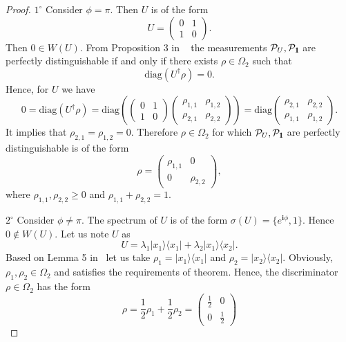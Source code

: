 \documentclass[11pt,a4paper,reqno, oneside]{amsart}
\newcommand{\ket}[1]{\ensuremath{|#1\rangle}}
\newcommand{\bra}[1]{\ensuremath{\langle#1|}}
\newcommand{\ketbra}[2]{\ensuremath{\ket{#1} \! \bra{#2}}}
\newcommand{\1}{{\rm 1\hspace{-0.9mm}l}}
\begin{document}
\begin{proof}
	$1^\circ$ Consider $\phi = \pi$. Then $U$ is of the form
	\begin{equation}
	U = \left(\begin{array}{cc}0&1\\1&0\end{array}\right).
	\end{equation}
Then $0 \in W(U)$. 	From Proposition 3 in ~\cite{puchala2018strategies} the measurements $\mathcal{P}_U, \mathcal{P}_\1$ are perfectly distinguishable if and only if there exists $\rho \in \Omega_2$ such that
	\begin{equation}
	\mathrm{diag}\left(U^\dagger \rho\right) = 0.
	\end{equation}
Hence, for $U $ we have 
	\begin{equation}
	0 = \mathrm{diag}\left(U^\dagger \rho\right) = \mathrm{diag} \left(\left(\begin{array}{cc}0&1\\1&0\end{array}\right)\left(\begin{array}{cc}\rho_{1,1}&\rho_{1,2}\\\rho_{2,1}&\rho_{2,2}\end{array}\right)\right) =  \mathrm{diag} \left(\begin{array}{cc}\rho_{2,1}&\rho_{2,2}\\\rho_{1,1}&\rho_{1,2}\end{array}\right).
	\end{equation}
 It implies that $\rho_{2,1}=\rho_{1,2} = 0$. Therefore $\rho \in \Omega_2$ for which $\mathcal{P}_U, \mathcal{P}_\1$  are perfectly distinguishable is of the form
	\begin{equation}
	\rho = \left(\begin{array}{cc}\rho_{1,1}&0\\0&\rho_{2,2}\end{array}\right),
	\end{equation}
	where $\rho_{1,1},\rho_{2,2} \ge 0$ and  $\rho_{1,1}+\rho_{2,2}=1$.

	$2^\circ$ Consider  $\phi \not = \pi$. 
The spectrum of $U$ is of the form $\sigma(U) = \{e^{\mathbf{i} \phi},1\}$. Hence $0 \not\in W\left(U\right)$.  Let us note $U$ as 
	\begin{equation}
	U= \lambda_1 \ketbra{x_1}{x_1} + \lambda_2 \ketbra{x_1}{x_2}.
	\end{equation}
Based on Lemma 5 in~\cite{puchala2018strategies} let us take $\rho_1 = \ketbra{x_1}{x_1}$ and $\rho_2 = \ketbra{x_2}{x_2}$. Obviously,  $\rho_1,\rho_2 \in \Omega_2$ and satisfies the requirements of theorem. Hence, the discriminator $\rho \in \Omega_2$ has the form 
	\begin{equation}
	\rho = \frac{1}{2} \rho_1 + \frac{1}{2}\rho_2 = \left(\begin{array}{cc}\frac{1}{2}&0\\0&\frac{1}{2}\end{array}\right)
	\end{equation}


\end{proof}
\end{document}
